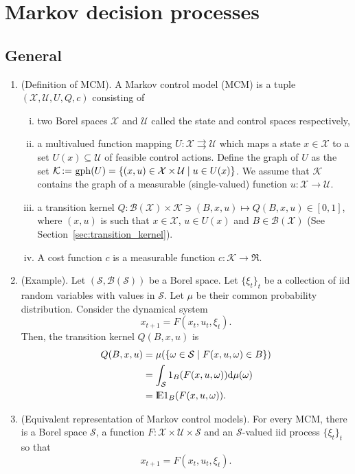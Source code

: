\documentclass[a4paper,10pt]{scrbook}
\begin{document}
\section{Markov decision processes}

\subsection{General}
\begin{enumerate}
 \item (Definition of MCM). 
       A Markov control model (MCM) is a tuple
       \(\left(\mathcal{X},\mathcal{U}, U, Q, c\right)\) consisting of 
       \begin{enumerate}[i.]
        \item two Borel spaces $\mathcal{X}$ and $\mathcal{U}$ called the state and control spaces respectively,
        
        \item a multivalued function mapping $U:\mathcal{X} \rightrightarrows \mathcal{U}$ which maps
              a state $x\in\mathcal{X}$ to a set $U(x)\subseteq \mathcal{U}$ of feasible control actions.
              Define the graph of $U$ as the set
	      $\mathcal{K} {}\mathop{\mathrel{:}=}{} \operatorname{gph}(U)=\{(x,u)\in \mathcal{X}\times \mathcal{U} \mid u\in U(x)\}$.
	      We assume that $\mathcal{K}$ contains the graph of a measurable (single-valued) function $u:\mathcal{X}\to\mathcal{U}$.
	      
        \item a transition kernel 
              $Q:\mathcal{B}(\mathcal{X})\times \mathcal{K}\ni(B,x,u)\mapsto Q(B, x, u)\in [0,1]$, where $(x,u)$ 
              is such that $x\in\mathcal{X}$, $u\in U(x)$ and $B\in\mathcal{B}(\mathcal{X})$ (See Section~\ref{sec:transition_kernel}).              
              
	\item A cost function $c$ is a measurable function $c:\mathcal{K}\to \Re$.
       \end{enumerate}
 \item (Example). Let $(\mathcal{S}, \mathcal{B}(\mathcal{S}))$ be a Borel space. 
	Let $\{\xi_t\}_t$ be a collection of iid random variables with values in $\mathcal{S}$.
	Let $\mu$ be their common probability distribution. Consider the dynamical system
	\[
	  x_{t+1} = F(x_t, u_t, \xi_t).
	\]
	Then, the transition kernel $Q(B,x,u)$ is
	\begin{align*}
	  Q(B,x,u) &= \mu(\{\omega \in \mathcal{S} \mid F(x,u,\omega)\in B\})\\
	  &= \int_{\mathcal{S}}1_{B}(F(x,u,\omega))\d\mu(\omega)\\
	  &= \E 1_{B}(F(x,u,\omega)).
	\end{align*}
 \item (Equivalent representation of Markov control models).
	For every MCM, there is a Borel space $\mathcal{S}$, a function 
	$F:\mathcal{X}\times\mathcal{U}\times\mathcal{S}$ and an $\mathcal{S}$-valued 
	iid process $\{\xi_t\}_t$ so that
	\[
	 x_{t+1} = F(x_t, u_t, \xi_t).
	\]


\end{enumerate}
\end{document}

